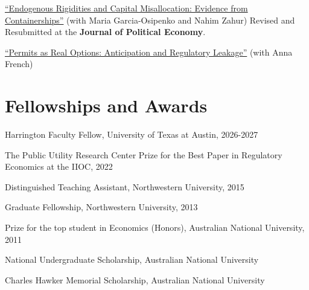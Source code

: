 \documentclass[margin,line]{res}
\newenvironment{list1}{
  \begin{list}{\ding{113}}{%
      \setlength{\itemsep}{.025in}
      \setlength{\parsep}{0in} \setlength{\parskip}{0in}
      \setlength{\topsep}{0in} \setlength{\partopsep}{0in}
      \setlength{\leftmargin}{0.17in}}}{\end{list}}
\begin{document}
\begin{resume}
\begin{list1}
\item[] \href{https://nvreug.github.io/paper/containerships.pdf}{``Endogenous Rigidities and Capital Misallocation: Evidence from Containerships''} (with Maria Garcia-Osipenko and Nahim Zahur) Revised and Resubmitted at the \textbf{Journal of Political Economy}.

\item[] \href{https://nvreug.github.io/paper/permits.pdf}{``Permits as Real Options: Anticipation and Regulatory Leakage''} (with Anna French)

\end{list1}

\section{Fellowships and Awards}
\begin{list1}
\item[] Harrington Faculty Fellow, University of Texas at Austin, 2026-2027
\item[] The Public Utility Research Center Prize for the Best Paper in Regulatory Economics at the IIOC, 2022
\item[] Distinguished Teaching Assistant, Northwestern University, 2015
\item[] Graduate Fellowship, Northwestern University, 2013
\item[] Prize for the top student in Economics (Honors), Australian National University, 2011
\item[] National Undergraduate Scholarship, Australian National University
\item[] Charles Hawker Memorial Scholarship, Australian National University
\end{list1}


\end{resume}
\end{document}
